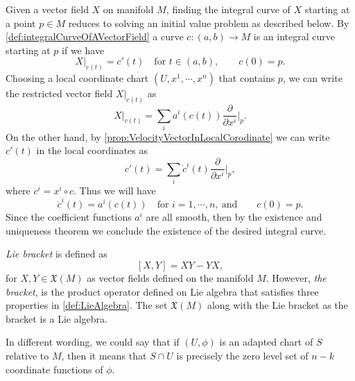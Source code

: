 \begin{summary}
	Given a vector field $ X $ on manifold $ M $, finding the integral curve of $ X $ starting at a point $ p \in M $ reduces to solving an initial value problem as described below. By \autoref{def:integralCurveOfAVectorField} a curve $ c:(a,b) \to M $ is an integral curve starting at $ p $ if we have
	\[ X|_{c(t)} = c'(t) \quad \text{for } t\in (a,b),\qquad c(0) = p.   \]
	Choosing a local coordinate chart $ (U,x^1,\cdots,x^n) $ that contains $ p $, we can write the restricted vector field $ X|_{c(t)} $ as
	\[ X|_{c(t)} = \sum_i a^i(c(t)) \frac{\partial}{\partial x^i}\big|_{p}.  \]
	On the other hand, by \autoref{prop:VelocityVectorInLocalCorodinate} we can write $ c'(t) $ in the local coordinates as
	\[ c'(t) = \sum_i \dot{c}^i(t) \frac{\partial }{\partial x^i}\big|_{p},    \]
	where $ c^i = x^i \circ c $.
	Thus we will have
	\[ \dot{c}^i(t) = a^i(c(t)) \quad \text{for } i=1,\cdots,n,\ \text{and} \qquad c(0) = p.\]
	Since the coefficient functions $ a^i $ are all smooth, then by the existence and uniqueness theorem we conclude the existence of the desired integral curve. 
\end{summary}

\begin{summary}
	\emph{Lie bracket} is defined as 
	\[ [X,Y] = XY - YX, \]
	for $ X,Y \in \mathfrak{X}(M) $ as vector fields defined on the manifold $ M $. However, \emph{the bracket}, is the product operator defined on Lie algebra that satisfies three properties in \autoref{def:LieAlgebra}. The set $ \mathfrak{X}(M) $ along with the Lie bracket as the bracket is a Lie algebra. 
\end{summary}

\begin{summary}
	In different wording, we could say that if $ (U,\phi) $ is an adapted chart of $ S  $ relative to $ M $, then it means that $ S\cap U $ is precisely the zero level set of $ n-k $ coordinate functions of $ \phi $.
\end{summary}



\newpage

